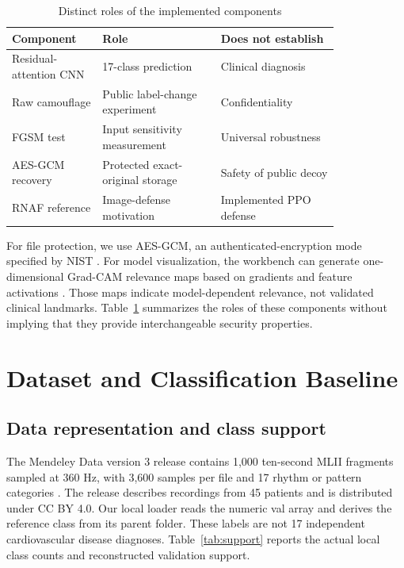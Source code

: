\documentclass{jpp}
\begin{document}
\begin{table}
\centering
\caption{Distinct roles of the implemented components}\label{tab:roles}
\small
\begin{tabular}{p{0.22\linewidth}p{0.30\linewidth}p{0.30\linewidth}}
\hline
Component & Role & Does not establish \\
\hline
Residual-attention CNN & 17-class prediction & Clinical diagnosis \\
Raw camouflage & Public label-change experiment & Confidentiality \\
FGSM test & Input sensitivity measurement & Universal robustness \\
AES-GCM recovery & Protected exact-original storage & Safety of public decoy \\
RNAF reference \cite{rizwan2025} & Image-defense motivation & Implemented PPO defense \\
\hline
\end{tabular}
\end{table}

For file protection, we use AES-GCM, an authenticated-encryption mode specified by NIST \cite{dworkin2007}. For model visualization, the workbench can generate one-dimensional Grad-CAM relevance maps based on gradients and feature activations \cite{selvaraju2019}. Those maps indicate model-dependent relevance, not validated clinical landmarks. Table~\ref{tab:roles} summarizes the roles of these components without implying that they provide interchangeable security properties.

\section{Dataset and Classification Baseline}

\subsection{Data representation and class support}

The Mendeley Data version 3 release contains 1,000 ten-second MLII fragments sampled at 360 Hz, with 3,600 samples per file and 17 rhythm or pattern categories \cite{plawiak2017}. The release describes recordings from 45 patients and is distributed under CC BY 4.0. Our local loader reads the numeric val array and derives the reference class from its parent folder. These labels are not 17 independent cardiovascular disease diagnoses. Table~\ref{tab:support} reports the actual local class counts and reconstructed validation support.
\end{document}
